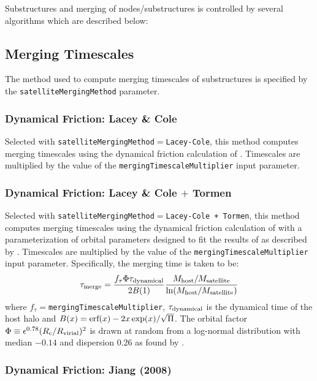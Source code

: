 Substructures and merging of nodes/substructures is controlled by several algorithms which are described below:

\subsection{Merging Timescales}

The method used to compute merging timescales of substructures is specified by the {\tt satelliteMergingMethod} parameter.

\subsubsection{Dynamical Friction: Lacey \& Cole}

Selected with {\tt satelliteMergingMethod}$=${\tt Lacey-Cole}, this method computes merging timescales using the dynamical friction calculation of \cite{lacey_merger_1993}. Timescales are multiplied by the value of the {\tt mergingTimescaleMultiplier} input parameter.

\subsubsection{Dynamical Friction: Lacey \& Cole $+$ Tormen}

Selected with {\tt satelliteMergingMethod}$=${\tt Lacey-Cole + Tormen}, this method computes merging timescales using the dynamical friction calculation of \cite{lacey_merger_1993} with a parameterization of orbital parameters designed to fit the results of \cite{tormen_rise_1997} as described by \cite{cole_hierarchical_2000}. Timescales are multiplied by the value of the {\tt mergingTimescaleMultiplier} input parameter. Specifically, the merging time is taken to be:
\begin{equation}
 \tau_{\rm merge} = {f_\tau \Phi \tau_{\rm dynamical} \over 2 B(1)} { M_{\rm host}/M_{\rm satellite} \over \ln (M_{\rm host}/M_{\rm satellite})}
\end{equation}
where $f_\tau=${\tt mergingTimescaleMultiplier}, $\tau_{\rm dynamical}$ is the dynamical time of the host halo and $B(x)=\hbox{erf}(x)-2 x \exp(x)/\sqrt{\Pi}$. The orbital factor $\Phi \equiv \epsilon^{0.78} (R_{\rm c}/R_{\rm virial})^2$ is drawn at random from a log-normal distribution with median $-0.14$ and dispersion $0.26$ as found by \cite{cole_hierarchical_2000}.

\subsubsection{Dynamical Friction: Jiang (2008)}

